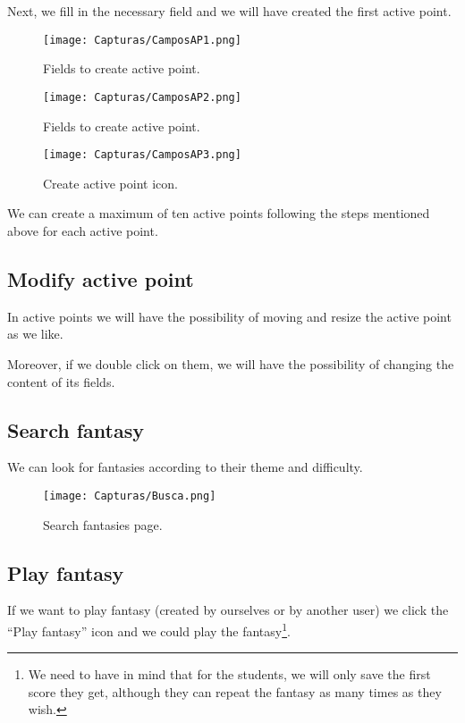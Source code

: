 \documentclass{book}
\begin{document}
Next, we fill in the necessary field and we will have created the first active point.

\begin{figure}[h]
	\centering
	\texttt{[image: Capturas/CamposAP1.png]}
	\caption{Fields to create active point.}
	\label{Fields to create AP2}
\end{figure}

\newpage

\begin{figure}[h]
	\centering
	\texttt{[image: Capturas/CamposAP2.png]}
	\caption{Fields to create active point.}
	\label{Fields to create AP3}
\end{figure}

\begin{figure}[h]
	\centering
	\texttt{[image: Capturas/CamposAP3.png]}
	\caption{Create active point icon.}
	\label{Create active point icon}
\end{figure}

We can create a maximum of ten active points following the steps mentioned above for each active point.


\subsection{Modify active point}
In active points we will have the possibility of moving and resize the active point as we like.

Moreover, if we double click on them, we will have the possibility of changing the content of its fields.


\newpage
\subsection{Search fantasy}
We can look for fantasies according to their theme and difficulty.

\begin{figure}[h]
	\centering
	\texttt{[image: Capturas/Busca.png]}
	\caption{Search fantasies page.}
	\label{Search fantasies page}
\end{figure}

\subsection{Play fantasy}
If we want to play fantasy (created by ourselves or by another user) we click the ``Play fantasy'' icon and we could play the fantasy\footnote{We need to have in mind that for the students, we will only save the first score they get, although they can repeat the fantasy as many times as they wish.}.
\end{document}
